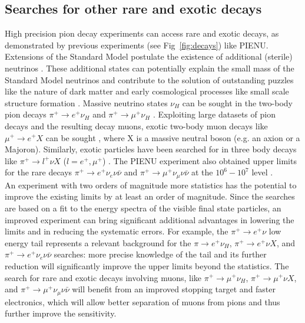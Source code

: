 \subsection{Searches for other rare and exotic decays}\label{Exotics}
High precision pion decay experiments can access rare and exotic decays, as  demonstrated by
previous experiments (see Fig~\ref{fig:decays}) like PIENU. Extensions of the Standard Model postulate the
existence of additional (sterile) neutrinos \cite{nuMSM}\cite{BrymanShrock}. These additional states can potentially explain
the small mass of the Standard Model neutrinos and contribute to the solution of outstanding puzzles like
the nature of dark matter  and early cosmological processes like small scale structure formation \cite{bertoni}.  
Massive neutrino states $\nu_H$ can be sought in the two-body pion decays
$\pi^+\rightarrow e^+\nu_H$ \cite{Aguilar-Arevalo1} and $\pi^+\rightarrow \mu^+\nu_H$ \cite{Aguilar-Arevalo2}. Exploiting
large datasets of pion decays and the resulting decay muons,  exotic two-body muon decays like $\mu^+\rightarrow e^+X$ can
be sought \cite{Aguilar-Arevalo6}, where X is a massive neutral boson (e.g. an axion or a Majoron).
Similarly, exotic particles have been searched for in three body decays like $\pi^+\rightarrow l^+ \nu X$ ($l=e^+,\mu^+$) \cite{Aguilar-Arevalo8}.
The PIENU experiment also obtained upper limits for the rare decays $\pi^+\rightarrow e^+\nu_e\nu\bar{\nu}$ and
$\pi^+\rightarrow \mu^+\nu_{\mu}\nu\bar{\nu}$ at the $10^6-10^7$ level \cite{Aguilar-Arevalo7}.\\
An experiment with two orders of magnitude more statistics has the potential to improve the existing limits by at least an order of magnitude.
Since the searches are based on a fit to the energy spectra of the visible final state particles, an improved experiment
can bring significant additional advantages in lowering the limits and in reducing the systematic errors. For example, 
the $\pi^+\rightarrow e^+\nu$ low energy tail represents a relevant background for the
$\pi\rightarrow e^+\nu_H$, $\pi^+\rightarrow e^+\nu X$, and $\pi^+\rightarrow e^+\nu_e\nu\bar{\nu}$ searches: 
more precise knowledge of the tail and its further reduction will significantly improve the upper limits beyond the statistics.
The search for rare and exotic decays involving  muons, like $\pi^+\rightarrow \mu^+\nu_H$, $\pi^+\rightarrow \mu^+\nu X$, and $\pi^+\rightarrow \mu^+\nu_{\mu}\nu\bar{\nu}$ will
benefit from an improved stopping target and faster electronics, which will allow better separation of  muons from pions and thus further improve the sensitivity.
